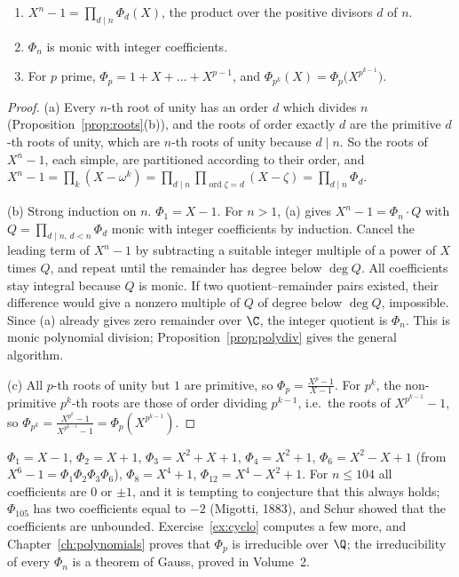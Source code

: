 \begin{proposition}\label{prop:cyclotomic}
\begin{enumerate}[label=(\alph*)]
\item $X^n-1=\prod_{d\mid n}\Phi_d(X)$, the product over the positive divisors $d$ of $n$.
\item $\Phi_n$ is monic with integer coefficients.
\item For $p$ prime, $\Phi_p=1+X+\dots+X^{p-1}$, and $\Phi_{p^k}(X)=\Phi_p\bigl(X^{p^{k-1}}\bigr)$.
\end{enumerate}
\end{proposition}
\begin{proof}
(a) Every $n$-th root of unity has an order $d$ which divides $n$ (Proposition~\ref{prop:roots}(b)), and the roots of order exactly $d$ are the primitive $d$-th roots of
unity, which are $n$-th roots of unity because $d\mid n$. So the roots of $X^n-1$, each simple, are partitioned according to their order, and
$X^n-1=\prod_k(X-\omega^k)=\prod_{d\mid n}\prod_{\operatorname{ord}\zeta=d}(X-\zeta)=\prod_{d\mid n}\Phi_d$.

(b) Strong induction on $n$. $\Phi_1=X-1$. For $n>1$, (a) gives $X^n-1=\Phi_n\cdot Q$ with $Q=\prod_{d\mid n,\,d<n}\Phi_d$ monic with integer
coefficients by induction. Cancel the leading term of $X^n-1$ by subtracting a suitable integer multiple of a power of $X$ times $Q$, and repeat until the remainder has degree below $\deg Q$. All coefficients stay integral because $Q$ is monic. If two quotient--remainder pairs existed, their difference would give a nonzero multiple of $Q$ of degree below $\deg Q$, impossible. Since (a) already gives zero remainder over $\C$, the integer quotient is $\Phi_n$. This is monic polynomial division; Proposition~\ref{prop:polydiv} gives the general algorithm.

(c) All $p$-th roots of unity but $1$ are primitive, so $\Phi_p=\frac{X^p-1}{X-1}$. For $p^k$, the non-primitive $p^k$-th roots are those of order dividing $p^{k-1}$,
i.e.\ the roots of $X^{p^{k-1}}-1$, so $\Phi_{p^k}=\frac{X^{p^k}-1}{X^{p^{k-1}}-1}=\Phi_p(X^{p^{k-1}})$.
\end{proof}

\begin{examplex}
$\Phi_1=X-1$, $\Phi_2=X+1$, $\Phi_3=X^2+X+1$, $\Phi_4=X^2+1$, $\Phi_6=X^2-X+1$ (from $X^6-1=\Phi_1\Phi_2\Phi_3\Phi_6$), $\Phi_8=X^4+1$,
$\Phi_{12}=X^4-X^2+1$. For $n\le104$ all coefficients are $0$ or $\pm1$, and it is tempting to conjecture that this always holds; $\Phi_{105}$ has two
coefficients equal to $-2$ (Migotti, 1883), and Schur showed that the coefficients are unbounded. Exercise~\ref{ex:cyclo} computes a few more, and Chapter~\ref{ch:polynomials} proves
that $\Phi_p$ is irreducible over $\Q$; the irreducibility of every $\Phi_n$ is a theorem of Gauss, proved in Volume~2.
\end{examplex}

